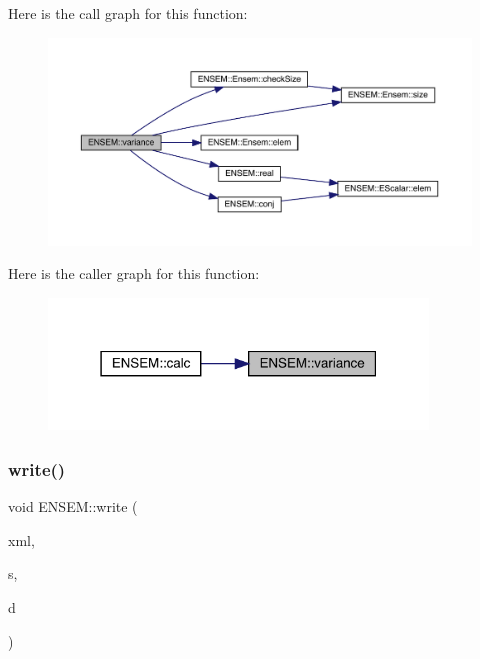 Here is the call graph for this function\+:\nopagebreak
\begin{figure}[H]
\begin{center}
\leavevmode
\includegraphics[width=350pt]{d2/d94/namespaceENSEM_a0745a1a4b4007ac858d64767bed5f6d4_cgraph}
\end{center}
\end{figure}
Here is the caller graph for this function\+:\nopagebreak
\begin{figure}[H]
\begin{center}
\leavevmode
\includegraphics[width=286pt]{d2/d94/namespaceENSEM_a0745a1a4b4007ac858d64767bed5f6d4_icgraph}
\end{center}
\end{figure}
\mbox{\label{namespaceENSEM_a1e0e32b9a435ad75c6308eed3fbccdb9}} 
\subsubsection{\texorpdfstring{write()}{write()}\hspace{0.1cm}{\footnotesize\ttfamily [1/13]}}
{\footnotesize\ttfamily void E\+N\+S\+E\+M\+::write (\begin{DoxyParamCaption}\item[{\mbox{\hyperlink{classADATXML_1_1XMLWriter}{A\+D\+A\+T\+X\+M\+L\+::\+X\+M\+L\+Writer}} \&}]{xml,  }\item[{const std\+::string \&}]{s,  }\item[{const \mbox{\hyperlink{classXMLArray_1_1Array}{Array}}$<$ \mbox{\hyperlink{group__defs_gab13d060149cdd80ab40fd8d653f60117}{Integer}} $>$ \&}]{d }\end{DoxyParamCaption})}

